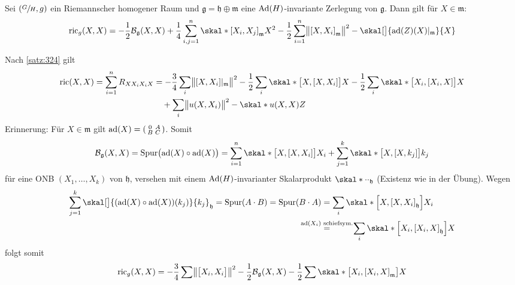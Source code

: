 \begin{satz}[{name=[Formel für die Ricci-Krümmung gleicher Vektoren]},label=satz:327]
	Sei $\enbrace*{\sfrac{G}{H},g}$ ein Riemannscher homogener Raum und $\mathfrak{g} = \mathfrak{h} \oplus \mathfrak{m}$ eine $\Ad(H)$-invariante Zerlegung von $\mathfrak{g}$.
	Dann gilt für $X \in \mathfrak{m}$:
	\[
		\operatorname{ric}_g(X,X) = - \frac{1}{2} \mathcal{B}_\mathfrak{g}(X,X) + \frac{1}{4} \sum_{i,j=1}^n \skal*{\benbrace*{X_i,X_j}_\mathfrak{m}}{X}^2 - \frac{1}{2} \sum_{i=1}^{n} \norm[\big]{\benbrace*{X,X_i}_\mathfrak{m}}^2 - \skal[\big]{\ad(Z)(X)|_\mathfrak{m}}{X}
	\]
\end{satz}
\begin{beweis}
	Nach \autoref{satz:324} gilt 
	\begin{align}
		\ric(X,X) = \sum_{i=1}^{n} R_{XX_iX_iX} &= - \frac{3}{4}\sum_{i} \norm[\big]{\benbrace*{X,X_i}|_\mathfrak{m}}^2 - \frac{1}{2} \sum_{i} \skal*{\benbrace[\big]{X,\benbrace*{X,X_i}}}{X} - \frac{1}{2} \sum_i \skal*{\benbrace[\big]{X_i,\benbrace*{X_i,X}}}{X} \\
		& \quad + \sum_i \norm[\big]{u(X,X_i)}^2 - \skal*{u(X,X)}{Z}
	\end{align}
	Erinnerung: Für $X \in \mathfrak{m}$ gilt $\ad(X) = \begin{psmallmatrix}
		0 & A \\ B & C
	\end{psmallmatrix}$.
	Somit
	\begin{align}
		\mathcal{B}_\mathfrak{g}(X,X) = \operatorname{Spur} \enbrace[\big]{\ad(X) \circ \ad(X)} = \sum_{i=1}^{n} \skal*{\benbrace[\big]{X,\benbrace*{X,X_i}}}{X_i} + \sum_{j=1}^{k} \skal*{\benbrace[\big]{X, \benbrace*{X,k_j}}}{k_j}
	\end{align}
	für eine ONB $(X_1, \ldots ,X_k)$ von $\mathfrak{h}$, versehen mit einem $\Ad(H)$-invarianter Skalarprodukt $\skal*{\cdot }{\cdot }_\mathfrak{h}$ (Existenz wie in der Übung).
	Wegen 
	\begin{align}
		\sum_{j=1}^{k} \skal[\big]{\enbrace*{\ad(X) \circ \ad(X)}(k_j)}{k_j}_\mathfrak{h} = \operatorname{Spur}(A \cdot B) = \operatorname{Spur}(B \cdot A) &= \sum_i \skal*{\benbrace*{X, \benbrace*{X,X_i}_\mathfrak{h}}}{X_i} \\
		&\StackTextClap{$\ad(X_i)$ schiefsym.}{=} \hspace{2.5em}\sum_i \skal*{\benbrace*{X_i , \benbrace*{X_i,X}_\mathfrak{h}}}{X}
	\end{align}
	folgt somit 
	\begin{align}
		\ric_g(X,X) &= -\frac{3}{4}  \sum \norm*{\benbrace[\big]{X_i,X_i}}^2 - \frac{1}{2} \mathcal{B}_\mathfrak{g}(X,X) - \frac{1}{2} \sum \skal*{\benbrace[\big]{X_i , \benbrace*{X_i,X}_\mathfrak{m}}}{X} \\

\end{align}
\end{beweis}
